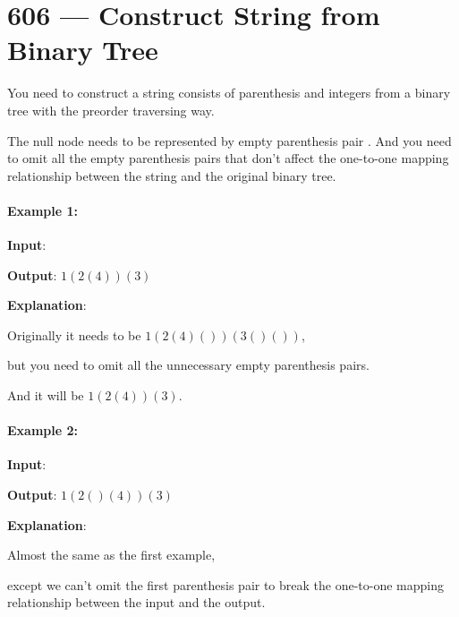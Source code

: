 \section{606 --- Construct String from Binary Tree}
You need to construct a string consists of parenthesis and integers from a binary tree with the preorder traversing way.

The null node needs to be represented by empty parenthesis pair \(\). And you need to omit all the empty parenthesis pairs that don't affect the one-to-one mapping relationship between the string and the original binary tree.

\paragraph{Example 1:}

\begin{flushleft}
\textbf{Input}:
\begin{figure}[H]
\end{figure}

\textbf{Output}: $ 1(2(4))(3) $

\textbf{Explanation}: 

Originally it needs to be $ 1(2(4)())(3()()) $, 

but you need to omit all the unnecessary empty parenthesis pairs. 

And it will be $ 1(2(4))(3) $.
\end{flushleft}

\paragraph{Example 2:}
\begin{flushleft}

\textbf{Input}:
\begin{figure}[H]
\end{figure}

\textbf{Output}: $ 1(2()(4))(3) $

\textbf{Explanation}: 

Almost the same as the first example, 

except we can't omit the first parenthesis pair to break the one-to-one mapping relationship between the input and the output.
\end{flushleft}